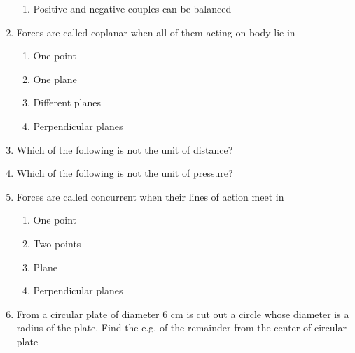 \documentclass[11pt,a4paper]{article}
\begin{document}
\begin{enumerate}
\begin{enumerate}[label=\Alph*.]
\item{Positive and negative couples can be balanced}
\end{enumerate}
\item{Forces are called coplanar when all of them acting on body lie in}
\begin{enumerate}[label=\Alph*.]
\item{One point}
\item{One plane}
\item{Different planes}
\item{Perpendicular planes}
\end{enumerate}
\item{Which of the following is not the unit of distance?}
\\
\item{Which of the following is not the unit of pressure?}
\\
\item{Forces are called concurrent when their lines of action meet in}
\begin{enumerate}[label=\Alph*.]
\item{One point}
\item{Two points}
\item{Plane}
\item{Perpendicular planes}
\end{enumerate}
\item{From a circular plate of diameter 6 cm is cut out a circle whose diameter is a radius of the plate. Find the e.g. of the remainder from the center of circular plate}
\\\begin{enumerate*}[itemjoin=\qquad, label=\Alph*.]
\item{0.5 cm}
\item{1.0 cm}
\item{1.5 cm}

\end{enumerate*}
\end{enumerate}
\end{document}
